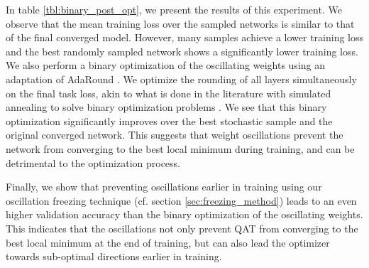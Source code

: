 In table \ref{tbl:binary_post_opt}, we present the results of this experiment. 
We observe that the mean training loss over the sampled networks is similar to that of the final converged model.
However, many samples achieve a lower training loss and the best randomly sampled network shows a significantly lower training loss. 
We also perform a binary optimization of the oscillating weights using an adaptation of AdaRound \citep{adaround}. We optimize the rounding of all layers simultaneously on the final task loss, akin to what is done in the literature with simulated annealing to solve binary optimization problems \citep{Kirkpatrick1983SimulatedAnnealing}. We see that this binary optimization significantly improves over the best stochastic sample and the original converged network. This suggests that weight oscillations prevent the network from converging to the best local minimum during training, and can be detrimental to the optimization process. 

Finally, we show that preventing oscillations earlier in training using our oscillation freezing technique (cf. section \ref{sec:freezing_method}) leads to an even higher validation accuracy than the binary optimization of the oscillating weights. This indicates that the oscillations not only prevent QAT from converging to the best local minimum at the end of training, but can also lead the optimizer towards sub-optimal directions earlier in training. 







